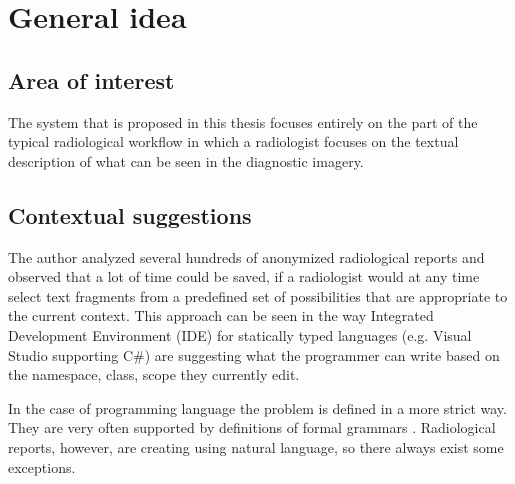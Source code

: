 \documentclass[12pt, twoside, openany]{report}
\theoremstyle{definition}
\begin{document}
\section{General idea}
\subsection{Area of interest}
The system that is proposed in this thesis focuses entirely on the part of the typical radiological workflow in which a radiologist focuses on the textual description of what can be seen in the diagnostic imagery.
\subsection{Contextual suggestions}
The author analyzed several hundreds of anonymized radiological reports and observed that a lot of time could be saved, if a radiologist would at any time select text fragments from a predefined set of possibilities that are appropriate to the current context. This approach can be seen in the way Integrated Development Environment (IDE) for statically typed languages (e.g. Visual Studio supporting C\#) are suggesting what the programmer can write based on the namespace, class, scope they currently edit.

In the case of programming language the problem is defined in a more strict way. They are very often supported by definitions of formal grammars \cite{csharp-spec}. Radiological reports, however, are creating using  natural language, so there always exist some exceptions.
\end{document}

